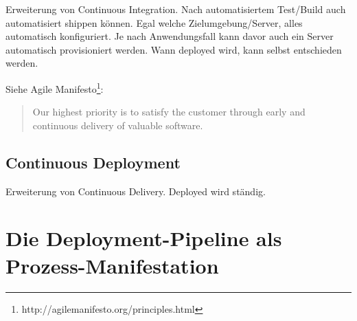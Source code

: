 \begin{draft}

Erweiterung von Continuous Integration. Nach automatisiertem Test/Build auch automatisiert shippen können. Egal welche Zielumgebung/Server, alles automatisch konfiguriert. Je nach Anwendungsfall kann davor auch ein Server automatisch provisioniert werden. Wann deployed wird, kann selbst entschieden werden.

Siehe Agile Manifesto\footnote{http://agilemanifesto.org/principles.html}:

\begin{quote}
  Our highest priority is to satisfy the customer through early and continuous delivery of valuable software.
\end{quote}


\subsection{Continuous Deployment}

Erweiterung von Continuous Delivery. Deployed wird ständig.


\section{Die Deployment-Pipeline als Prozess-Manifestation} \label{sec02:deployment-pipeline}
\end{draft}

